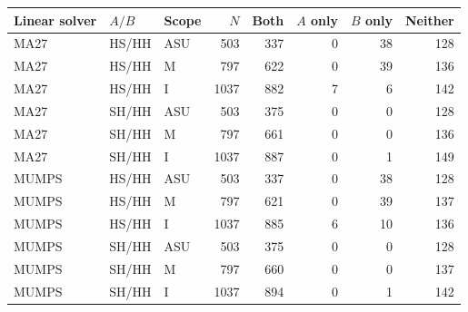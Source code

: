 \begin{tabular}{@{}lllrrrrr@{}}
\toprule
Linear solver & $A/B$ & Scope & $N$ & Both & $A$ only & $B$ only & Neither\\
\midrule
MA27 & HS/HH & ASU & 503 & 337 & 0 & 38 & 128\\
MA27 & HS/HH & M & 797 & 622 & 0 & 39 & 136\\
MA27 & HS/HH & I & 1037 & 882 & 7 & 6 & 142\\
MA27 & SH/HH & ASU & 503 & 375 & 0 & 0 & 128\\
MA27 & SH/HH & M & 797 & 661 & 0 & 0 & 136\\
MA27 & SH/HH & I & 1037 & 887 & 0 & 1 & 149\\
MUMPS & HS/HH & ASU & 503 & 337 & 0 & 38 & 128\\
MUMPS & HS/HH & M & 797 & 621 & 0 & 39 & 137\\
MUMPS & HS/HH & I & 1037 & 885 & 6 & 10 & 136\\
MUMPS & SH/HH & ASU & 503 & 375 & 0 & 0 & 128\\
MUMPS & SH/HH & M & 797 & 660 & 0 & 0 & 137\\
MUMPS & SH/HH & I & 1037 & 894 & 0 & 1 & 142\\
\bottomrule
\end{tabular}
